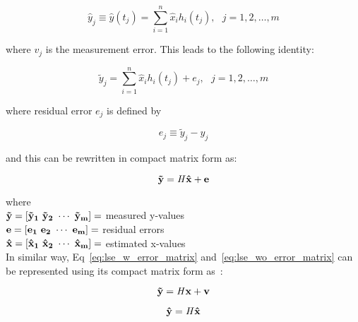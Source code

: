 \begin{equation}
    \hat{y}_{j} \equiv \hat{y}(t_{j}) = \sum_{i = 1}^{n}{\hat{x}_{i} h_{i}(t_{j})},~~~j = 1, 2, \ldots, m
    \label{eq:lse_wo_error}
\end{equation}

where $v_{j}$ is the measurement error. This leads to the following identity:

\begin{equation}
    \tilde{y}_{j} = \sum_{i = 1}^{n}{\hat{x}_{i} h_{i}(t_{j}) + e_{j}},~~~j = 1, 2, \ldots, m
    \label{eq:lse_w_rerror}
\end{equation}

where residual error $e_{j}$ is defined by

\begin{equation}
    e_{j} \equiv \tilde{y}_{j} - \hat{y}_{j}
    \label{eq:residual_error}
\end{equation}

and this can be rewritten in compact matrix form as:

\begin{equation}
    \bf{\tilde{y}} = \bf{\it{H}} \bf{\hat{x}} + \bf{e}
\end{equation}

where ~\cite{crassidis2004dynamic} \\

$\bf{\tilde{y}} = \left[ \tilde{y}_{1} ~ \tilde{y}_{2} ~ \cdots ~ \tilde{y}_{m} \right] = $ measured y-values \\

$\bf{e} = \left[ e_{1} ~ e_{2} ~ \cdots ~ e_{m} \right] = $ residual errors \\

$\bf{\hat{x}} = \left[ \hat{x}_{1} ~ \hat{x}_{2} ~ \cdots ~ \hat{x}_{m} \right] = $ estimated x-values \\

In similar way, Eq~\ref{eq:lse_w_error_matrix} and~\ref{eq:lse_wo_error_matrix} can be represented using its compact matrix form as~\cite{crassidis2004dynamic}:

\begin{equation}
    \bf{\tilde{y}} = \bf{\it{H}} \bf{x} + \bf{v}
    \label{eq:lse_w_error_matrix}
\end{equation}

\begin{equation}
    \bf{\hat{y}} = \bf{\it{H}} \bf{\hat{x}}
    \label{eq:lse_wo_error_matrix}
\end{equation}

